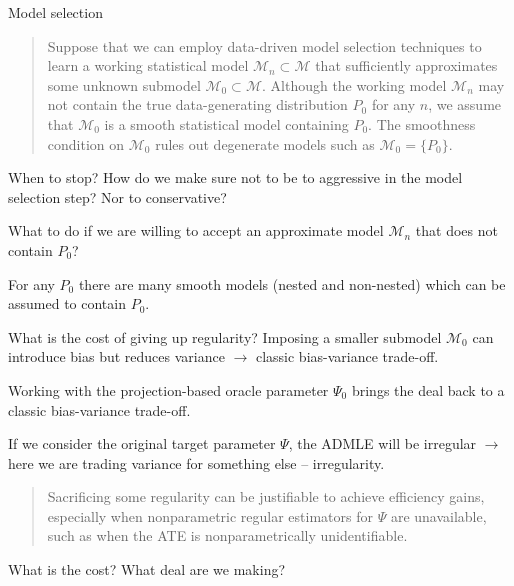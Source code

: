 \documentclass[smaller]{beamer}\usepackage{listings}
\newcommand{\1}{\mathds{1}}
\begin{document}
\begin{frame}[label={sec:orgfd6327a}]{Model selection}
\begin{quote} %
Suppose that we can employ data-driven model selection techniques to learn a
working statistical model \(\mathcal{M}_n \subset \mathcal{M}\) that sufficiently
approximates some unknown submodel \(\mathcal{M}_0 \subset \mathcal{M}\). Although
the working model \(\mathcal{M}_n\) may not contain the true data-generating
distribution \(P_0\) for any \(n\), we assume that \(\mathcal{M}_0\) is a
smooth statistical model containing \(P_0\). The smoothness condition on \(\mathcal{M}_0\) rules out degenerate models such as \(\mathcal{M}_0 = \{P_0\}\).

\flushright \cite{van2023adaptive}
\end{quote}

\begin{block}{}
When to stop? How do we make sure not to be to aggressive in the model selection
step? Nor to conservative?

\hfill

What to do if we are willing to accept an approximate model \(\mathcal{M}_n\)
that does not contain \(P_0\)?

\hfill

For any \(P_0\) there are many smooth models (nested and non-nested) which can
be assumed to contain \(P_0\).
\end{block}
\end{frame}


\begin{frame}[label={sec:orgfa4d9a4}]{What is the cost of giving up regularity?}
Imposing a smaller submodel \(\mathcal{M}_0\) can introduce bias but reduces
variance \(\rightarrow\) classic bias-variance trade-off.

\vfill

Working with the projection-based oracle parameter \(\Psi_0\) brings the deal back
to a classic bias-variance trade-off.

\vfill

If we consider the original target parameter \(\Psi\), the ADMLE will be irregular
\(\rightarrow\) here we are trading variance for something else -- irregularity.

\vfill

\begin{quote} %
Sacrificing some regularity can be justifiable to achieve efficiency gains,
especially when nonparametric regular estimators for \(\Psi\) are unavailable,
such as when the ATE is nonparametrically unidentifiable.

\flushright \cite{van2023adaptive}
\end{quote}

\begin{block}{}
What is the cost? What deal are we making?
\end{block}
\end{frame}
\end{document}
